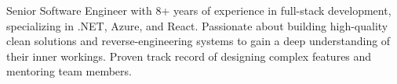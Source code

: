 \documentclass[9pt]{developercv} %
\begin{document}

\begin{minipage}[t]{0.46\textwidth} %
	\vspace{-\baselineskip} %

	Senior Software Engineer with 8+ years of experience in full-stack development, specializing in .NET, Azure, and React. 
	Passionate about building high-quality clean solutions and reverse-engineering systems to gain a deep understanding of their inner workings. 
	Proven track record of designing complex features and mentoring team members.

\end{minipage}
\hfill %
\begin{minipage}[t]{0.5\textwidth} %
	\vspace{-\baselineskip} %
	\begin{barchart}{5.5}
	\end{barchart}
\end{minipage}

\begin{center}
\end{center}


\end{document}
